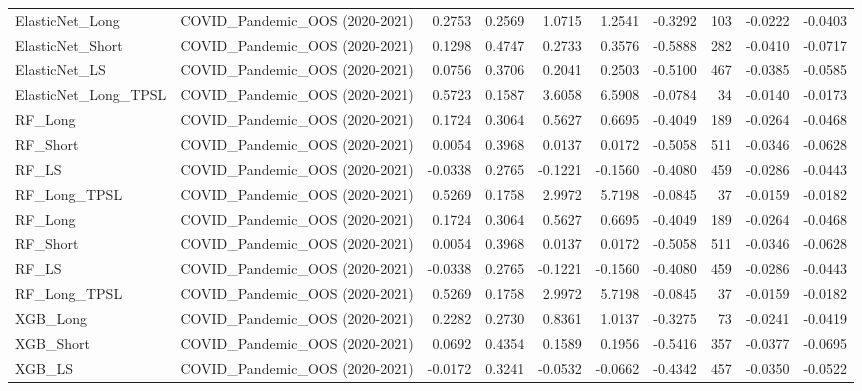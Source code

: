 \begin{tabular}{llrrrrrrrr}
\cline{1-10}
ElasticNet\_Long & COVID\_Pandemic\_OOS (2020-2021) & 0.2753 & 0.2569 & 1.0715 & 1.2541 & -0.3292 & 103 & -0.0222 & -0.0403 \\
\cline{1-10}
ElasticNet\_Short & COVID\_Pandemic\_OOS (2020-2021) & 0.1298 & 0.4747 & 0.2733 & 0.3576 & -0.5888 & 282 & -0.0410 & -0.0717 \\
\cline{1-10}
ElasticNet\_LS & COVID\_Pandemic\_OOS (2020-2021) & 0.0756 & 0.3706 & 0.2041 & 0.2503 & -0.5100 & 467 & -0.0385 & -0.0585 \\
\cline{1-10}
ElasticNet\_Long\_TPSL & COVID\_Pandemic\_OOS (2020-2021) & 0.5723 & 0.1587 & 3.6058 & 6.5908 & -0.0784 & 34 & -0.0140 & -0.0173 \\
\cline{1-10}
RF\_Long & COVID\_Pandemic\_OOS (2020-2021) & 0.1724 & 0.3064 & 0.5627 & 0.6695 & -0.4049 & 189 & -0.0264 & -0.0468 \\
\cline{1-10}
RF\_Short & COVID\_Pandemic\_OOS (2020-2021) & 0.0054 & 0.3968 & 0.0137 & 0.0172 & -0.5058 & 511 & -0.0346 & -0.0628 \\
\cline{1-10}
RF\_LS & COVID\_Pandemic\_OOS (2020-2021) & -0.0338 & 0.2765 & -0.1221 & -0.1560 & -0.4080 & 459 & -0.0286 & -0.0443 \\
\cline{1-10}
RF\_Long\_TPSL & COVID\_Pandemic\_OOS (2020-2021) & 0.5269 & 0.1758 & 2.9972 & 5.7198 & -0.0845 & 37 & -0.0159 & -0.0182 \\
\cline{1-10}
RF\_Long & COVID\_Pandemic\_OOS (2020-2021) & 0.1724 & 0.3064 & 0.5627 & 0.6695 & -0.4049 & 189 & -0.0264 & -0.0468 \\
\cline{1-10}
RF\_Short & COVID\_Pandemic\_OOS (2020-2021) & 0.0054 & 0.3968 & 0.0137 & 0.0172 & -0.5058 & 511 & -0.0346 & -0.0628 \\
\cline{1-10}
RF\_LS & COVID\_Pandemic\_OOS (2020-2021) & -0.0338 & 0.2765 & -0.1221 & -0.1560 & -0.4080 & 459 & -0.0286 & -0.0443 \\
\cline{1-10}
RF\_Long\_TPSL & COVID\_Pandemic\_OOS (2020-2021) & 0.5269 & 0.1758 & 2.9972 & 5.7198 & -0.0845 & 37 & -0.0159 & -0.0182 \\
\cline{1-10}
XGB\_Long & COVID\_Pandemic\_OOS (2020-2021) & 0.2282 & 0.2730 & 0.8361 & 1.0137 & -0.3275 & 73 & -0.0241 & -0.0419 \\
\cline{1-10}
XGB\_Short & COVID\_Pandemic\_OOS (2020-2021) & 0.0692 & 0.4354 & 0.1589 & 0.1956 & -0.5416 & 357 & -0.0377 & -0.0695 \\
\cline{1-10}
XGB\_LS & COVID\_Pandemic\_OOS (2020-2021) & -0.0172 & 0.3241 & -0.0532 & -0.0662 & -0.4342 & 457 & -0.0350 & -0.0522 \\

\end{tabular}
